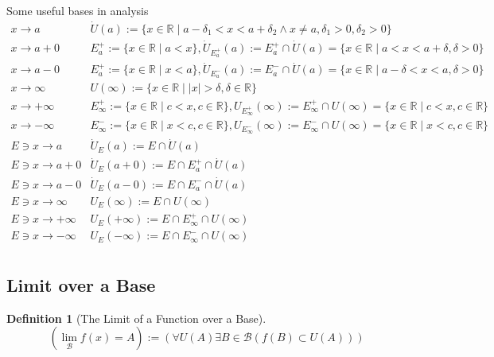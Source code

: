 \documentclass[onecolumn]{ctexart}
\newtheorem{definition}{Definition}
\begin{document}
Some useful bases in analysis
\[
  \begin{matrix}
    x \to a & \dot{U}(a):= \lbrace x \in \mathbb{R} \mid a - \delta_1 < x < a + \delta_2 \wedge x \neq a, \delta_1 > 0, \delta_2 > 0\rbrace \\
    x \to a+0 & E_a^+ := \lbrace x \in \mathbb{R} \mid a < x \rbrace, \dot{U}_{E_a^+}(a) := E_a^+ \cap \dot{U}(a) = \lbrace x \in \mathbb{R} \mid a < x < a + \delta, \delta > 0 \rbrace \\
    x \to a-0 & E_a^+ := \lbrace x \in \mathbb{R} \mid x < a \rbrace, \dot{U}_{E_a^-}(a) := E_a^- \cap \dot{U}(a) = \lbrace x \in \mathbb{R} \mid a - \delta < x < a, \delta > 0 \rbrace \\
    x \to \infty & U(\infty) := \lbrace x \in \mathbb{R} \mid |x| > \delta, \delta \in \mathbb{R} \rbrace \\
    x \to +\infty & E_{\infty}^+ := \lbrace x \in \mathbb{R} \mid c < x, c \in \mathbb{R} \rbrace, U_{E_{\infty}^+}(\infty) := E_{\infty}^+ \cap U(\infty) = \lbrace x \in \mathbb{R} \mid c < x, c \in \mathbb{R} \rbrace \\
    x \to -\infty & E_{\infty}^- := \lbrace x \in \mathbb{R} \mid x < c, c \in \mathbb{R} \rbrace, U_{E_{\infty}^-}(\infty) := E_{\infty}^- \cap U(\infty) = \lbrace x \in \mathbb{R} \mid x < c, c \in \mathbb{R} \rbrace \\
    E \owns x \to a & \dot{U}_E(a) := E \cap \dot{U}(a) \\
    E \owns x \to a+0 & \dot{U}_E(a+0) := E \cap E_a^+ \cap \dot{U}(a) \\
    E \owns x \to a-0 & \dot{U}_E(a-0) := E \cap E_a^- \cap \dot{U}(a) \\
    E \owns x \to \infty & U_E(\infty) := E \cap U(\infty) \\
    E \owns x \to +\infty & U_E(+\infty) := E \cap E_{\infty}^+ \cap U(\infty) \\
    E \owns x \to -\infty & U_E(-\infty) := E \cap E_{\infty}^- \cap U(\infty)\\
  \end{matrix}
\]

\subsection{Limit over a Base}

\begin{definition}[The Limit of a Function over a Base]
  \begin{equation}
    (\lim_{\mathcal{B}} f(x) = A) := (\forall U(A) \exists B \in \mathcal{B} (f(B) \subset U(A)))
  \end{equation}
\end{definition}
\end{document}
